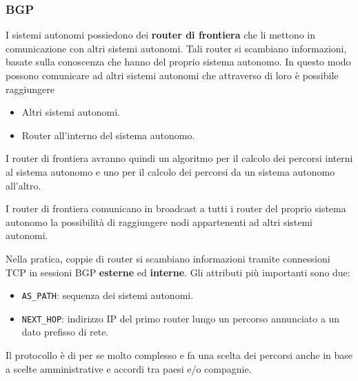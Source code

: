 \subsubsection{BGP}
I sistemi autonomi possiedono dei \textbf{router di frontiera} che li
mettono in comunicazione con altri sistemi autonomi. Tali router si 
scambiano informazioni, basate sulla conoscenza che hanno del proprio 
sistema autonomo. In questo modo possono comunicare ad altri sistemi 
autonomi che attraverso di loro è possibile raggiungere
\begin{itemize}
	\item Altri sistemi autonomi.
	\item Router all'interno del sistema autonomo.
\end{itemize}
I router di frontiera avranno quindi un algoritmo per il calcolo dei
percorsi interni al sistema autonomo e uno per il calcolo dei percorsi 
da un sistema autonomo all'altro.

I router di frontiera comunicano in broadcast a tutti i router del 
proprio sistema autonomo la possibilità di raggiungere nodi 
appartenenti ad altri sistemi autonomi.

Nella pratica, coppie di router si scambiano informazioni tramite
connessioni TCP in sessioni BGP \textbf{esterne} ed \textbf{interne}.
Gli attributi più importanti sono due:
\begin{itemize}
	\item \verb|AS_PATH|: sequenza dei sistemi autonomi.
	\item \verb|NEXT_HOP|: indirizzo IP del primo router lungo un
		percorso annunciato a un dato prefisso di rete.
\end{itemize}
Il protocollo è di per se molto complesso e fa una scelta dei percorsi
anche in base a scelte amministrative e accordi tra paesi e/o 
compagnie.
